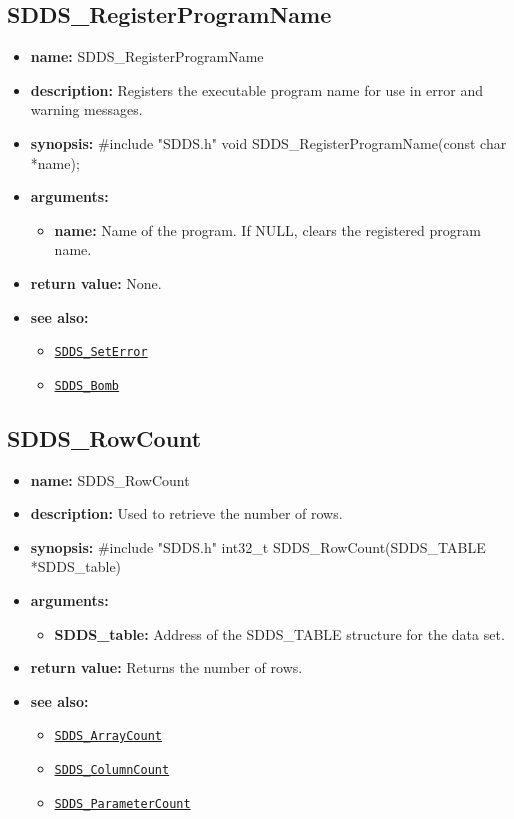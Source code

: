 \documentclass[11pt]{article}
\newcommand{\progref}[1]{\hyperref[SDDS_#1]{\tt SDDS\_#1}}
\begin{document}
\subsection{SDDS\_RegisterProgramName}
\label{SDDS_RegisterProgramName}

\begin{itemize}
\item {\bf name:}\newline
SDDS\_RegisterProgramName
\item {\bf description:}\newline
Registers the executable program name for use in error and warning messages.
\item {\bf synopsis:} \#include "SDDS.h"\newline
void SDDS\_RegisterProgramName(const char *name);
\item {\bf arguments:}
\begin{itemize}
\item {\bf name:} Name of the program. If NULL, clears the registered program name.
\end{itemize}
\item {\bf return value:}\newline
None.
\item {\bf see also:}
\begin{itemize}
\item \progref{SetError}
\item \progref{Bomb}
\end{itemize}
\end{itemize}

\subsection{SDDS\_RowCount}
\label{SDDS_RowCount}

\begin{itemize}
\item {\bf name:}\newline
SDDS\_RowCount
\item {\bf description:}\newline
Used to retrieve the number of rows.
\item {\bf synopsis:} \#include "SDDS.h"\newline
int32\_t SDDS\_RowCount(SDDS\_TABLE *SDDS\_table)
\item {\bf arguments:}
\begin{itemize}
\item {\bf SDDS\_table:} Address of the SDDS\_TABLE structure for the data set.
\end{itemize}
\item {\bf return value:}\newline
Returns the number of rows.
\item {\bf see also:}
\begin{itemize}
\item \progref{ArrayCount}
\item \progref{ColumnCount}
\item \progref{ParameterCount}
\end{itemize}
\end{itemize}
\end{document}
